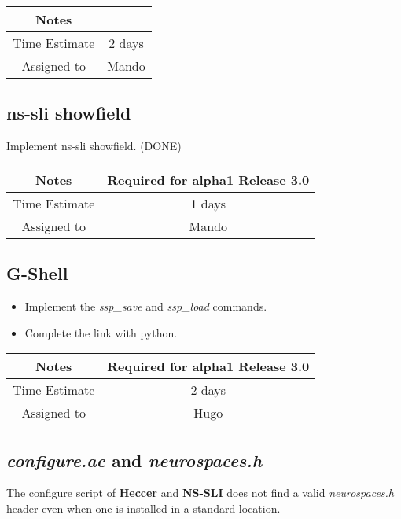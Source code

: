 \documentclass[12pt]{article}
\begin{document}
{
  \vspace{5mm}
  \centering
  \begin{tabular}{|c|c|}
    \hline
    Notes
    & \\
    \hline
    Time Estimate
    & 2 days \\
    \hline
    Assigned to
    & Mando \\
    \hline
  \end{tabular}
}


\subsection{ns-sli showfield}

Implement ns-sli showfield. (DONE)

{
  \vspace{5mm}
  \centering
  \begin{tabular}{|c|c|}
    \hline
    Notes
    & Required for alpha1 Release 3.0 \\
    \hline
    Time Estimate
    & 1 days \\
    \hline
    Assigned to
    & Mando \\
    \hline
  \end{tabular}
}


\subsection{G-Shell}
\begin{itemize}
\item Implement the {\it ssp\_save} and {\it ssp\_load} commands.
\item Complete the link with python.
\end{itemize}

{
  \vspace{5mm}
  \centering
  \begin{tabular}{|c|c|}
    \hline
    Notes
    & Required for alpha1 Release 3.0 \\
    \hline
    Time Estimate
    & 2 days \\
    \hline
    Assigned to
    & Hugo \\
    \hline
  \end{tabular}
}


\subsection{{\it configure.ac} and {\it neurospaces.h}}

The configure script of {\bf Heccer} and {\bf NS-SLI} does not find a valid
{\it neurospaces.h} header even when one is installed in a standard
location.
\end{document}
